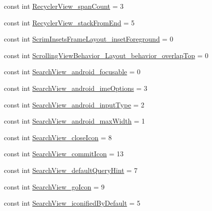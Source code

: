 \begin{DoxyCompactItemize}
const int \mbox{\hyperlink{class_f_w_p_s___app_1_1_droid_1_1_resource_1_1_styleable_a67ead325aafe7f43c3663132c0fc1234}{Recycler\+View\+\_\+span\+Count}} = 3
\item 
const int \mbox{\hyperlink{class_f_w_p_s___app_1_1_droid_1_1_resource_1_1_styleable_a7803e197b44a1b616cdc68c16a52796e}{Recycler\+View\+\_\+stack\+From\+End}} = 5
\item 
const int \mbox{\hyperlink{class_f_w_p_s___app_1_1_droid_1_1_resource_1_1_styleable_a319a1d8016d77efb0e2a89bfc252bcee}{Scrim\+Insets\+Frame\+Layout\+\_\+inset\+Foreground}} = 0
\item 
const int \mbox{\hyperlink{class_f_w_p_s___app_1_1_droid_1_1_resource_1_1_styleable_a16e26e3143b726aef3343a1df172d81e}{Scrolling\+View\+Behavior\+\_\+\+Layout\+\_\+behavior\+\_\+overlap\+Top}} = 0
\item 
const int \mbox{\hyperlink{class_f_w_p_s___app_1_1_droid_1_1_resource_1_1_styleable_a9552c49f7a92eba1941a901a1f139247}{Search\+View\+\_\+android\+\_\+focusable}} = 0
\item 
const int \mbox{\hyperlink{class_f_w_p_s___app_1_1_droid_1_1_resource_1_1_styleable_ad13e3ce9c139c252b06b4f2254bdd0a3}{Search\+View\+\_\+android\+\_\+ime\+Options}} = 3
\item 
const int \mbox{\hyperlink{class_f_w_p_s___app_1_1_droid_1_1_resource_1_1_styleable_a8fb15bac748750b874a3da749e8c3167}{Search\+View\+\_\+android\+\_\+input\+Type}} = 2
\item 
const int \mbox{\hyperlink{class_f_w_p_s___app_1_1_droid_1_1_resource_1_1_styleable_ae005cee46ef530d24bb6ac40290b9d85}{Search\+View\+\_\+android\+\_\+max\+Width}} = 1
\item 
const int \mbox{\hyperlink{class_f_w_p_s___app_1_1_droid_1_1_resource_1_1_styleable_a923c0928e69b97f3c37d9bc4a83ecc6e}{Search\+View\+\_\+close\+Icon}} = 8
\item 
const int \mbox{\hyperlink{class_f_w_p_s___app_1_1_droid_1_1_resource_1_1_styleable_af4e02117fd8f42977f1018ddf377f023}{Search\+View\+\_\+commit\+Icon}} = 13
\item 
const int \mbox{\hyperlink{class_f_w_p_s___app_1_1_droid_1_1_resource_1_1_styleable_a43ecc1a8ea21c57a71648a81564adf82}{Search\+View\+\_\+default\+Query\+Hint}} = 7
\item 
const int \mbox{\hyperlink{class_f_w_p_s___app_1_1_droid_1_1_resource_1_1_styleable_ae2d11cfc9d38e13fc97b229673c67bdc}{Search\+View\+\_\+go\+Icon}} = 9
\item 
const int \mbox{\hyperlink{class_f_w_p_s___app_1_1_droid_1_1_resource_1_1_styleable_acb98b12048750c0840f238f1e59d0207}{Search\+View\+\_\+iconified\+By\+Default}} = 5

\end{DoxyCompactItemize}
